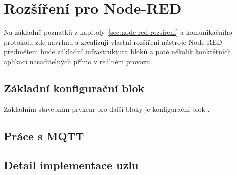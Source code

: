 \chapter{Rozšíření pro Node-RED}
\label{ch:rozsireni}

Na základně poznatků z kapitoly~\ref{sec:node-red-rozsireni} a komunikačního protokolu zde navrhnu a zrealizuji vlastní
rozšíření nástroje Node-RED -- předmětem bude základní infrastruktura bloků a poté několik konkrétních aplikací
nasaditelných přímo v reálném provozu.

\section{Základní konfigurační blok}
Základním stavebním prvkem pro další bloky je konfigurační blok .

\section{Práce s MQTT}

\section{Detail implementace uzlu}
